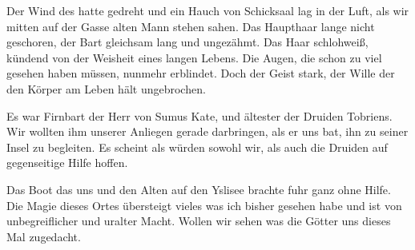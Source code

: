 Der Wind des hatte gedreht und ein Hauch von Schicksaal lag in der Luft, als wir mitten auf der Gasse alten Mann stehen sahen. Das Haupthaar lange nicht geschoren, der Bart gleichsam lang und ungezähmt. Das Haar schlohweiß, kündend von der Weisheit eines langen Lebens. Die Augen, die schon zu viel gesehen haben müssen, nunmehr erblindet. Doch der Geist stark, der Wille der den Körper am Leben hält ungebrochen.

Es war Firnbart der Herr von Sumus Kate, und ältester der Druiden Tobriens. Wir wollten ihm unserer Anliegen gerade darbringen, als er uns bat, ihn zu seiner Insel zu begleiten. Es scheint als würden sowohl wir, als auch die Druiden auf gegenseitige Hilfe hoffen.

Das Boot das uns und den Alten auf den Yslisee brachte fuhr ganz ohne Hilfe. Die Magie dieses Ortes übersteigt vieles was ich bisher gesehen habe und ist von unbegreiflicher und uralter Macht.
Wollen wir sehen was die Götter uns dieses Mal zugedacht.

